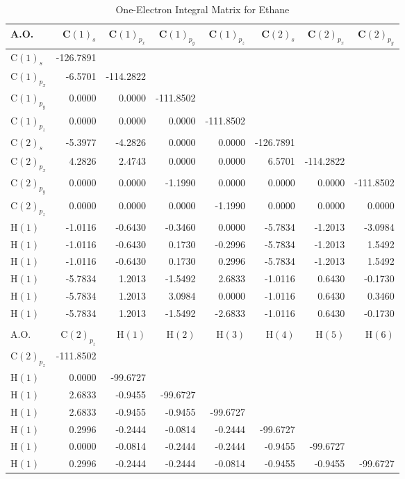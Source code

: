 \begin{table}
\caption{\label{c2h6f}One-Electron Integral Matrix for Ethane}
\begin{center}
\begin{tabular}{l|rrrrrrr} \hline
A.O.&C$(1)_s$&C$(1)_{p_x}$&C$(1)_{p_y}$&C$(1)_{p_z}$&C$(2)_s$&C$(2)_{p_x}$&C$(2)_{p_y}$\\
\hline
C$(1)_s$&-126.7891\\
C$(1)_{p_x}$ &  -6.5701 &-114.2822\\
C$(1)_{p_y}$ &   0.0000&  0.0000&-111.8502\\
C$(1)_{p_z}$ &   0.0000&  0.0000&  0.0000&-111.8502\\
C$(2)_s$     &  -5.3977& -4.2826&  0.0000&  0.0000&-126.7891\\
C$(2)_{p_x}$ &   4.2826&  2.4743&  0.0000&  0.0000&  6.5701&-114.2822\\
C$(2)_{p_y}$ &   0.0000&  0.0000& -1.1990&  0.0000&  0.0000&  0.0000 &-111.8502\\C$(2)_{p_z}$ &   0.0000&  0.0000&  0.0000& -1.1990&  0.0000&  0.0000 &  0.0000 \\H$(1)$       &  -1.0116& -0.6430& -0.3460&  0.0000& -5.7834& -1.2013 & -3.0984\\
H$(1)$       &  -1.0116& -0.6430&  0.1730& -0.2996& -5.7834& -1.2013 &  1.5492\\
H$(1)$       &  -1.0116& -0.6430&  0.1730&  0.2996& -5.7834& -1.2013 &  1.5492\\
H$(1)$       &  -5.7834&  1.2013& -1.5492&  2.6833& -1.0116&  0.6430 & -0.1730\\
H$(1)$       &  -5.7834&  1.2013&  3.0984&  0.0000& -1.0116&  0.6430 &  0.3460 \\H$(1)$       &  -5.7834 &  1.2013& -1.5492& -2.6833& -1.0116&  0.6430 & -0.1730\\\rule[-0.0cm]{0cm}{0.6cm}\\
\hline
A.O.&C$(2)_{p_z}$&H$(1)$&H$(2)$&H$(3)$&H$(4)$&H$(5)$&H$(6)$\\
\hline
C$(2)_{p_z}$&-111.8502\\
H$(1)$ &0.0000    & -99.6727\\
H$(1)$ &2.6833    &  -0.9455& -99.6727\\
H$(1)$ &2.6833    &  -0.9455&  -0.9455& -99.6727\\
H$(1)$ &0.2996    &  -0.2444&  -0.0814&  -0.2444& -99.6727\\
H$(1)$ &0.0000    &  -0.0814&  -0.2444&  -0.2444&  -0.9455& -99.6727\\
H$(1)$ &0.2996    &  -0.2444&  -0.2444&  -0.0814&  -0.9455&  -0.9455& -99.6727\\
\hline
\end{tabular}
\end{center}
\end{table}

